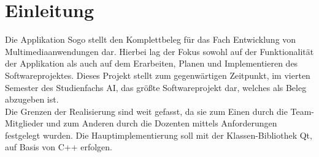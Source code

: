 \documentclass[a4paper]{scrartcl}
\begin{document}
\newpage

%
%
\thispagestyle{empty}

\tableofcontents

\newpage

%
%

\setcounter{page}{3}

\section{Einleitung}\label{ch:Einleitung}
Die Applikation Sogo stellt den Komplettbeleg für das Fach Entwicklung von Multimediaanwendungen dar. Hierbei lag der Fokus sowohl auf der Funktionalität der Applikation als auch auf dem Erarbeiten, Planen und Implementieren des Softwareprojektes. Dieses Projekt stellt zum gegenwärtigen Zeitpunkt, im vierten Semester des Studienfachs AI, das größte Softwareprojekt dar, welches als Beleg abzugeben ist.
\\
Die Grenzen der Realisierung sind weit gefasst, da sie zum Einen durch die Team-Mitglieder und zum Anderen durch die Dozenten mittels Anforderungen festgelegt wurden. Die Hauptimplementierung soll mit der Klassen-Bibliothek Qt, auf Basis von C++ erfolgen.

\end{document}
